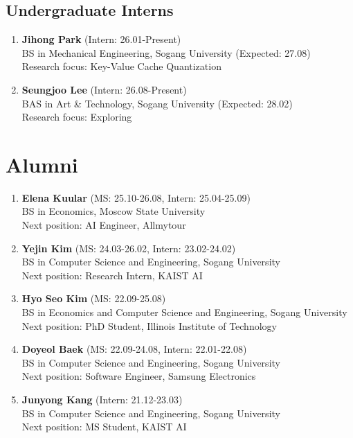 \documentclass[letterpaper,11pt]{article}
\begin{document}
\subsection*{Undergraduate Interns}
\begin{enumerate}

\item \textbf{Jihong Park} (Intern: 26.01-Present)\\
BS in Mechanical Engineering, Sogang University (Expected: 27.08)\\
Research focus: Key-Value Cache Quantization

\item \textbf{Seungjoo Lee} (Intern: 26.08-Present)\\
BAS in Art \& Technology, Sogang University (Expected: 28.02)\\
Research focus: Exploring

\end{enumerate}

\section{Alumni}

\begin{enumerate}

\item \textbf{Elena Kuular} (MS: 25.10-26.08, Intern: 25.04-25.09)\\
BS in Economics, Moscow State University\\
Next position: AI Engineer, Allmytour

\item \textbf{Yejin Kim} (MS: 24.03-26.02, Intern: 23.02-24.02)\\
BS in Computer Science and Engineering, Sogang University\\
Next position: Research Intern, KAIST AI

\item \textbf{Hyo Seo Kim} (MS: 22.09-25.08)\\
BS in Economics and Computer Science and Engineering, Sogang University\\
Next position: PhD Student, Illinois Institute of Technology

\item \textbf{Doyeol Baek} (MS: 22.09-24.08, Intern: 22.01-22.08)\\
BS in Computer Science and Engineering, Sogang University\\
Next position: Software Engineer, Samsung Electronics

\item \textbf{Junyong Kang} (Intern: 21.12-23.03)\\
BS in Computer Science and Engineering, Sogang University\\
Next position: MS Student, KAIST AI

\end{enumerate}
\end{document}
